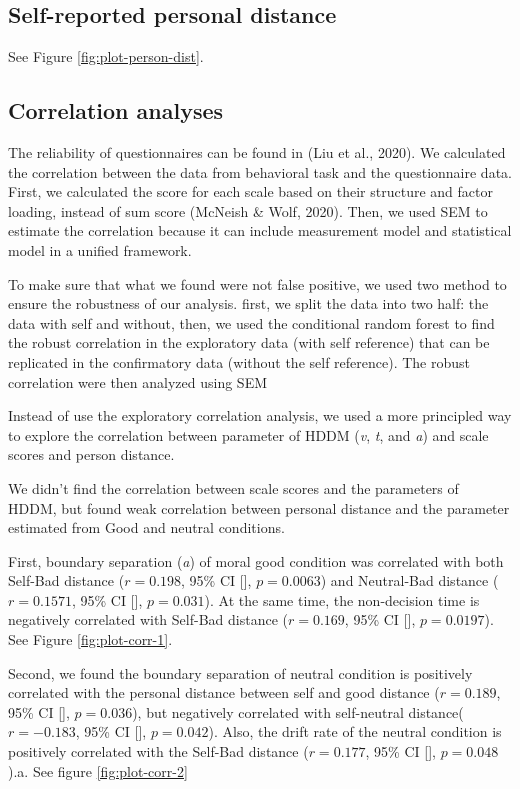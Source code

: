 \documentclass[
  english,
  man]{apa6}
\begin{document}
\hypertarget{self-reported-personal-distance}{%
\subsection{Self-reported personal distance}\label{self-reported-personal-distance}}

See Figure \ref{fig:plot-person-dist}.

\hypertarget{correlation-analyses}{%
\subsection{Correlation analyses}\label{correlation-analyses}}

The reliability of questionnaires can be found in (Liu et al., 2020). We calculated the correlation between the data from behavioral task and the questionnaire data. First, we calculated the score for each scale based on their structure and factor loading, instead of sum score (McNeish \& Wolf, 2020). Then, we used SEM to estimate the correlation because it can include measurement model and statistical model in a unified framework.

To make sure that what we found were not false positive, we used two method to ensure the robustness of our analysis. first, we split the data into two half: the data with self and without, then, we used the conditional random forest to find the robust correlation in the exploratory data (with self reference) that can be replicated in the confirmatory data (without the self reference). The robust correlation were then analyzed using SEM

Instead of use the exploratory correlation analysis, we used a more principled way to explore the correlation between parameter of HDDM (\emph{v}, \emph{t}, and \emph{a}) and scale scores and person distance.

We didn't find the correlation between scale scores and the parameters of HDDM, but found weak correlation between personal distance and the parameter estimated from Good and neutral conditions.

First, boundary separation (\emph{a}) of moral good condition was correlated with both Self-Bad distance (\(r = 0.198\), 95\% CI {[}{]}, \(p = 0.0063\)) and Neutral-Bad distance (\(r = 0.1571\), 95\% CI {[}{]}, \(p = 0.031\)). At the same time, the non-decision time is negatively correlated with Self-Bad distance (\(r = 0.169\), 95\% CI {[}{]}, \(p = 0.0197\)). See Figure \ref{fig:plot-corr-1}.

Second, we found the boundary separation of neutral condition is positively correlated with the personal distance between self and good distance (\(r = 0.189\), 95\% CI {[}{]}, \(p = 0.036\)), but negatively correlated with self-neutral distance(\(r = -0.183\), 95\% CI {[}{]}, \(p = 0.042\)). Also, the drift rate of the neutral condition is positively correlated with the Self-Bad distance (\(r = 0.177\), 95\% CI {[}{]}, \(p = 0.048\)).a. See figure \ref{fig:plot-corr-2}
\end{document}
